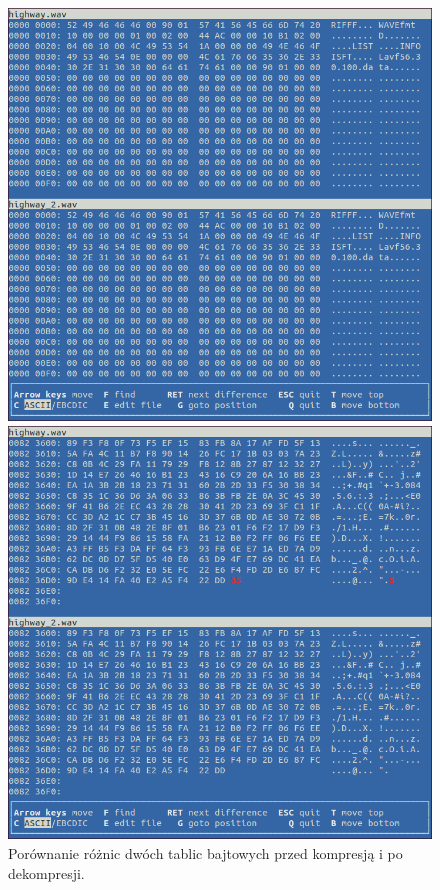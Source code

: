 \documentclass[12pt,a4paper,notitlepage]{report}
\begin{document}
\begin{figure}[H]
	\centering
	\begin{minipage}{0.45\textwidth}
		\centering
		\includegraphics[scale=.3]{highway_beg}
	\end{minipage}\hfill
	\begin{minipage}{0.45\textwidth}
		\centering
		\includegraphics[scale=.3]{highway_end}
	\end{minipage}
	\caption{Porównanie różnic dwóch tablic bajtowych przed kompresją i po dekompresji.}	
\end{figure}
\end{document}
